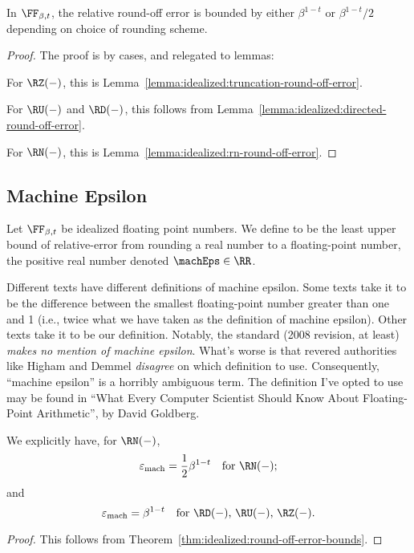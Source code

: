 \begin{thm}\label{thm:idealized:round-off-error-bounds}
  In $\FF_{\beta,t}$, the relative round-off error is bounded by either
  $\beta^{1-t}$ or $\beta^{1-t}/2$ depending on choice of rounding scheme.
\end{thm}
\begin{proof}
  The proof is by cases, and relegated to lemmas:

  For $\RZ(-)$, this is Lemma~\ref{lemma:idealized:truncation-round-off-error}.
  
  For $\RU(-)$ and $\RD(-)$, this follows from Lemma~\ref{lemma:idealized:directed-round-off-error}.

  For $\RN(-)$, this is Lemma~\ref{lemma:idealized:rn-round-off-error}.
\end{proof}

\subsection{Machine Epsilon}

\begin{defn}\label{defn:idealized:machine-epsilon}
Let $\FF_{\beta,t}$ be idealized floating point numbers. We define
 to be the least upper bound of relative-error from
rounding a real number to a floating-point number,
the positive real number denoted $\machEps\in\RR$.
\end{defn}

\begin{ddanger}
  Different texts have different definitions of machine epsilon. Some
  texts take it to be the difference between the smallest floating-point
  number greater than one and 1 (i.e., twice what we have taken as the
  definition of machine epsilon). Other texts take it to be our
  definition. Notably, the  standard (2008 revision, at least)
  \emph{makes no mention of machine epsilon}. What's worse is that
  revered authorities like Higham and Demmel \emph{disagree} on which
  definition to use. Consequently, ``machine epsilon'' is a horribly
  ambiguous term. The definition I've opted to use may be found in
  ``What Every Computer Scientist Should Know About Floating-Point
  Arithmetic'', by David Goldberg.
\end{ddanger}

\begin{thm}
  We explicitly have, for $\RN(-)$,  
  \begin{equation*}
    \varepsilon_{\text{mach}} = \frac{1}{2}\beta^{1-t}\quad\mbox{for $\RN(-)$};
  \end{equation*}
  and
  \begin{equation*}
    \varepsilon_{\text{mach}} = \beta^{1-t}\quad\mbox{for $\RD(-)$, $\RU(-)$, $\RZ(-)$}.
  \end{equation*}
\end{thm}
\begin{proof}
  This follows from Theorem~\ref{thm:idealized:round-off-error-bounds}.
\end{proof}


